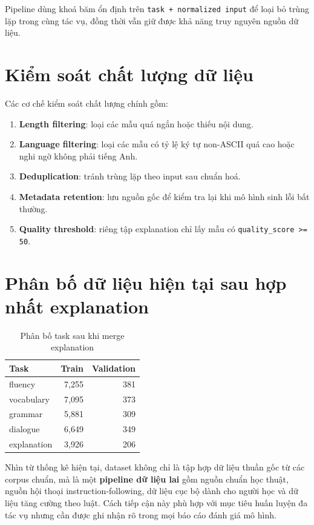 \documentclass[12pt,a4paper]{article}
\begin{document}
Pipeline dùng khoá băm ổn định trên \texttt{task + normalized input} để loại bỏ trùng lặp trong cùng tác vụ, đồng thời vẫn giữ được khả năng truy nguyên nguồn dữ liệu.

\section{Kiểm soát chất lượng dữ liệu}

Các cơ chế kiểm soát chất lượng chính gồm:

\begin{enumerate}[leftmargin=1.2cm]
    \item \textbf{Length filtering}: loại các mẫu quá ngắn hoặc thiếu nội dung.
    \item \textbf{Language filtering}: loại các mẫu có tỷ lệ ký tự non-ASCII quá cao hoặc nghi ngờ không phải tiếng Anh.
    \item \textbf{Deduplication}: tránh trùng lặp theo input sau chuẩn hoá.
    \item \textbf{Metadata retention}: lưu nguồn gốc để kiểm tra lại khi mô hình sinh lỗi bất thường.
    \item \textbf{Quality threshold}: riêng tập explanation chỉ lấy mẫu có \texttt{quality\_score >= 50}.
\end{enumerate}

\section{Phân bố dữ liệu hiện tại sau hợp nhất explanation}

\begin{table}[h]
\centering
\begin{tabular}{lrr}
\toprule
\textbf{Task} & \textbf{Train} & \textbf{Validation} \\
\midrule
fluency & 7,255 & 381 \\
vocabulary & 7,095 & 373 \\
grammar & 5,881 & 309 \\
dialogue & 6,649 & 349 \\
explanation & 3,926 & 206 \\
\bottomrule
\end{tabular}
\caption{Phân bố task sau khi merge explanation}
\end{table}

Nhìn từ thống kê hiện tại, dataset không chỉ là tập hợp dữ liệu thuần gốc từ các corpus chuẩn, mà là một \textbf{pipeline dữ liệu lai} gồm nguồn chuẩn học thuật, nguồn hội thoại instruction-following, dữ liệu cục bộ dành cho người học và dữ liệu tăng cường theo luật. Cách tiếp cận này phù hợp với mục tiêu huấn luyện đa tác vụ nhưng cần được ghi nhận rõ trong mọi báo cáo đánh giá mô hình.
\end{document}
